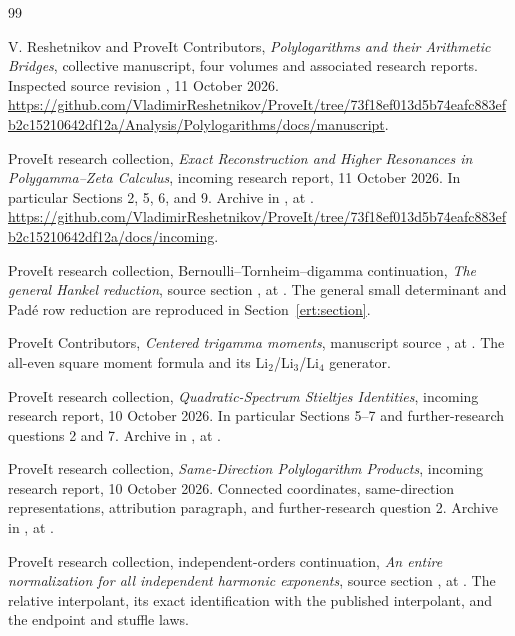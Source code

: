 \begin{thebibliography}{99}

V. Reshetnikov and ProveIt Contributors,
\emph{Polylogarithms and their Arithmetic Bridges}, collective manuscript,
four volumes and associated research reports.  Inspected source revision
\sourcepin, 11 October 2026.
\url{https://github.com/VladimirReshetnikov/ProveIt/tree/73f18ef013d5b74eafc883efb2c15210642df12a/Analysis/Polylogarithms/docs/manuscript}.

ProveIt research collection,
\emph{Exact Reconstruction and Higher Resonances in Polygamma--Zeta Calculus}, incoming research report,
11 October 2026.  In particular Sections 2, 5, 6, and 9.
Archive 
in , at \sourcepin.
\url{https://github.com/VladimirReshetnikov/ProveIt/tree/73f18ef013d5b74eafc883efb2c15210642df12a/docs/incoming}.

ProveIt research collection, Bernoulli--Tornheim--digamma continuation,
\emph{The general Hankel reduction}, source section
,
at \sourcepin.  The general small determinant and Pad\'e row
reduction are reproduced in Section~\ref{ert:section}.

ProveIt Contributors, \emph{Centered trigamma moments}, manuscript source
,
at \sourcepin.  The all-even square moment formula and its
Li$_2$/Li$_3$/Li$_4$ generator.

ProveIt research collection, \emph{Quadratic-Spectrum Stieltjes
Identities}, incoming research report, 10 October 2026.  In particular
Sections 5--7 and further-research questions 2 and 7.
Archive 
in , at \sourcepin.

ProveIt research collection, \emph{Same-Direction Polylogarithm Products},
incoming research report, 10 October 2026.  Connected coordinates,
same-direction representations, attribution paragraph, and
further-research question 2.
Archive 
in , at \sourcepin.

ProveIt research collection, independent-orders continuation,
\emph{An entire normalization for all independent harmonic exponents},
source section
,
at \sourcepin.  The relative interpolant, its exact identification
with the published interpolant, and the endpoint and stuffle laws.


\end{thebibliography}

